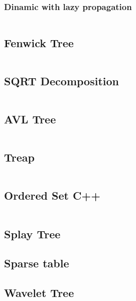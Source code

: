 \documentclass[11pt]{article}
\begin{document}
			\subsubsection{Dinamic with lazy propagation}
			\inputminted[tabsize=2,breaklines,firstline=39,lastline=90,fontsize=\small]{c++}{queries.cpp}
		
		\subsection{Fenwick Tree}
		\inputminted[tabsize=2,breaklines,firstline=92,lastline=129,fontsize=\small]{c++}{queries.cpp}
		
		\subsection{SQRT Decomposition}
		\inputminted[tabsize=2,breaklines,firstline=131,lastline=209,fontsize=\small]{c++}{queries.cpp}
		
		\subsection{AVL Tree}
		\inputminted[tabsize=2,breaklines,firstline=211,lastline=415,fontsize=\small]{c++}{queries.cpp}
		
		\subsection{Treap}
		\inputminted[tabsize=2,breaklines,firstline=417,lastline=510,fontsize=\small]{c++}{queries.cpp}
		
		\subsection{Ordered Set C++}
		\inputminted[tabsize=2,breaklines,firstline=512,lastline=545,fontsize=\small]{c++}{queries.cpp}
		
		\subsection{Splay Tree}
		
		
		\subsection{Sparse table}
		
		
		\subsection{Wavelet Tree}
		
\end{document}
